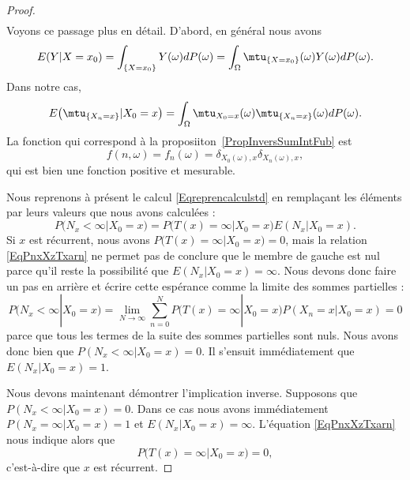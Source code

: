 \begin{proof}
\begin{subequations}
\begin{align}
		\end{align}
	\end{subequations}
	Voyons ce passage plus en détail. D'abord, en général nous avons
	\begin{equation}
		E(Y|X=x_0)=\int_{\{ X=x_0 \}}Y(\omega)dP(\omega)
		=\int_{\Omega}\mtu_{\{ X=x_0 \}}(\omega)Y(\omega)dP(\omega).
	\end{equation}
	Dans notre cas,
	\begin{equation}
		E\big( \mtu_{\{ X_n=x \}}|X_0=x \big)=\int_{\Omega}\mtu_{X_0=x}(\omega)\mtu_{\{ X_n=x \}}(\omega)dP(\omega).
	\end{equation}
	La fonction qui correspond à la proposiiton~\ref{PropInversSumIntFub} est
	\begin{equation}
		f(n,\omega)=f_n(\omega)=\delta_{X_0(\omega),x}\delta_{X_n(\omega),x},
	\end{equation}
	qui est bien une fonction positive et mesurable.

	Nous reprenons à présent le calcul \eqref{Eqreprencalculstd} en remplaçant les éléments par leurs valeurs que nous avons calculées :
	\begin{equation}    \label{EqPnxXzTxarn}
		P(N_x<\infty|X_0=x)=P\big(T(x)=\infty|X_0=x\big)E(N_x|X_0=x).
	\end{equation}
	Si \( x\) est récurrent, nous avons \( P\big( T(x)=\infty|X_0=x \big)=0\), mais la relation \eqref{EqPnxXzTxarn} ne permet pas de conclure que le membre de gauche est nul parce qu'il reste la possibilité que \( E(N_x|X_0=x)=\infty\). Nous devons donc faire un pas en arrière et écrire cette espérance comme la limite des sommes partielles :
	\begin{equation}
		P(N_x<\infty|X_0=x)=\lim_{N\to \infty} \sum_{n=0}^NP\big( T(x)=\infty|X_0=x \big)P(X_n=x|X_0=x)=0
	\end{equation}
	parce que tous les termes de la suite des sommes partielles sont nuls. Nous avons donc bien que \( P(N_x<\infty|X_0=x)=0\). Il s'ensuit immédiatement que \( E(N_x|X_0=x)=1\).

	Nous devons maintenant démontrer l'implication inverse. Supposons que \( P(N_x<\infty|X_0=x)=0\). Dans ce cas nous avons immédiatement \( P(N_x=\infty|X_0=x)=1\) et \( E(N_x|X_0=x)=\infty\). L'équation \eqref{EqPnxXzTxarn} nous indique alors que
	\begin{equation}
		P\big( T(x)=\infty|X_0=x \big)=0,
	\end{equation}
	c'est-à-dire que \( x\) est récurrent.
\end{proof}

